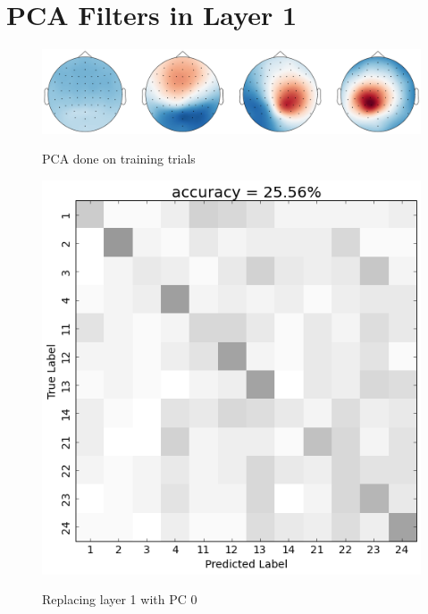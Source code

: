 \chapter{PCA Filters in Layer 1} \label{appendix:PCAInvestigation}
\begin{figure}[h] 
  \begin{center}
   \includegraphics[width=.5\textwidth,keepaspectratio=true]{Figures/PCA_SVM}
   \\\vspace{-0.8em}
    \caption{PCA done on training trials}
    \label{fig:PCA_SVM}
  \end{center}
  \vspace{-1em}
\end{figure}

\begin{figure}[h] 
  \begin{center}
    \includegraphics[scale=0.5]{Figures/PC0_confusion}
   \\\vspace{-0.8em}
    \caption{Replacing layer 1 with PC 0}
    \label{fig:PC0_confusion}
  \end{center}
  \vspace{-1em}
\end{figure}

